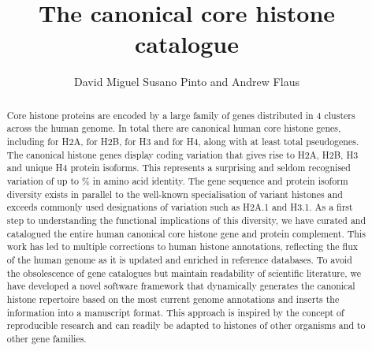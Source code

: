 \documentclass[10pt,a4paper,onecolumn,article,draft]{memoir}
\author{David Miguel Susano Pinto and Andrew Flaus}
\title{The canonical core histone catalogue}
\begin{document}

  \maketitle

  \begin{abstract}
	Core histone proteins are encoded by a large family of genes distributed in 4 clusters across the human genome.
	In total there are \TotalGenes{} canonical human core histone genes, including
	\HTwoACodingGenes{} for H2A, \HTwoBCodingGenes{} for H2B,
	\HThreeCodingGenes{} for H3 and \HFourCodingGenes{} for H4, 
	along with at least \TotalPseudoGenes{} total pseudogenes.
	The canonical histone genes display coding variation that gives rise to
	\HTwoAUniqueProteins{} H2A, \HTwoBUniqueProteins{} H2B, 
	\HThreeUniqueProteins{} H3 and \HFourUniqueProteins{} unique H4 protein isoforms.
	This represents a surprising and seldom recognised variation
	of up to \% in amino acid identity. 
	The gene sequence and protein isoform diversity exists 
	in parallel to the well-known specialisation of variant histones 
	and exceeds commonly used designations of variation such as H2A.1 and H3.1. 
	As a first step to understanding the functional implications of this diversity, 
	we have curated and catalogued the entire human canonical core histone gene and protein complement.
	This work has led to multiple corrections to human histone annotations, 
	reflecting the flux of the human genome as it is updated and enriched in reference databases. 
	To avoid the obsolescence of gene catalogues but maintain readability of scientific literature, 
	we have developed a novel software framework that dynamically generates the canonical histone repertoire 
	based on the most current genome annotations and inserts the information into a manuscript format. 
	This approach is inspired by the concept of reproducible research 
	and can readily be adapted to histones of other organisms and to other gene families.
  \end{abstract}
\end{document}
